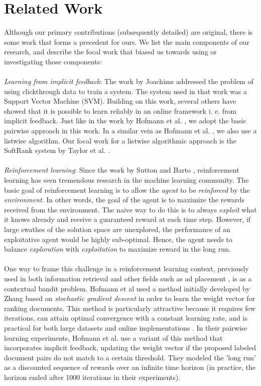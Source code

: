 \documentclass{acm_proc_article-sp}
\begin{document}
\section{Related Work}
Although our primary contributions (subsequently detailed) are original, there is some work that forms a precedent for ours. We list the main components of our research, and describe the focal work that biased us towards using or investigating those components:\\ \\
\emph{Learning from implicit feedback}: The work by Joachims \cite{joachims} addressed the problem of using clickthrough data to train a system. The system used in that work was a Support Vector Machine (SVM). Building on this work, several others have showed that it is possible to learn reliably in an online framework i. e. from implicit feedback. Just like in the work by Hofmann et al. \cite{hofmann}, we adopt the basic pairwise approach in this work.  In a similar vein as Hofmann et al. \cite{hofmann}, we also use a listwise algorithm. Our focal work for a listwise algorithmic approach is the SoftRank system by Taylor et al. \cite{taylor}. \\ \\
\emph{Reinforcement learning}: Since the work by Sutton and Barto \cite{rl}, reinforcement learning has seen tremendous research in the machine learning community. The basic goal of reinforcement learning is to allow the \emph{agent} to be \emph{reinforced} by the \emph{environment}. In other words, the goal of the agent is to maximize the rewards received from the environment. The naive way to do this is to always \emph{exploit} what it knows already and receive a guaranteed reward at each time step. However, if large swathes of the solution space are unexplored, the performance of an exploitative agent would be highly sub-optimal. Hence, the agent needs to balance \emph{exploration} with \emph{exploitation} to maximize reward in the long run. \\ \\
One way to frame this challenge in a reinforcement learning context, previously used in both information retrieval and other fields such as ad placement \cite{langford}, is as a contextual bandit problem.  Hofmann et al \cite{hofmann} used a method initially developed by Zhang \cite{zhang} based on \emph{stochastic gradient descent} in order to learn the weight vector for ranking documents.  This method is particularly attractive because it requires few iterations, can attain optimal convergence with a constant learning rate, and is practical for both large datasets and online implementations \cite{zhang}.  In their pairwise learning experiments, Hofmann et al. \cite{hofmann} use a variant of this method that incorporates implicit feedback, updating the weight vector if the proposed labeled document pairs do not match to a certain threshold.  They modeled the 'long run' as a discounted sequence of rewards over an infinite time horizon (in practice, the horizon ended after 1000 iterations in their experiments). \\ \\
\end{document}
